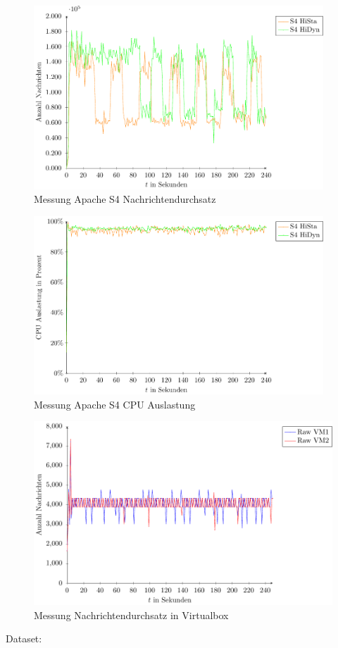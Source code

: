\begin{figure}
\includegraphics[width=0.97\textwidth]{plots/messungS4Durchsatz.pdf}
\caption{Messung Apache S4 Nachrichtendurchsatz
\label{fig:messungS4Nd}}
\end{figure}
\begin{figure}
\includegraphics[width=0.97\textwidth]{plots/messungS4Cpu.pdf}
\caption{Messung Apache S4 CPU Auslastung
\label{fig:messungS4Cpu}}
\end{figure}



\begin{figure}
\includegraphics[width=1.0\textwidth]{plots/virtualBoxRaw.pdf}
\caption{Messung Nachrichtendurchsatz in Virtualbox
\label{fig:messungMaxNachrichten}}
\end{figure}

Dataset: 